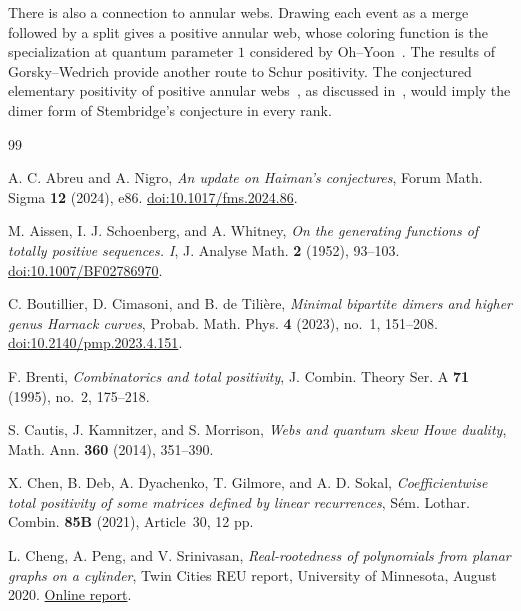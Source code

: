 \documentclass[11pt]{article}
\theoremstyle{definition}
\theoremstyle{remark}
\begin{document}
There is also a connection to annular webs.
Drawing each event as a merge followed by a
split gives a positive annular web, whose
coloring function is the specialization at
quantum parameter $1$ considered by
Oh--Yoon~\cite[Section~3]{OY}.
The results of Gorsky--Wedrich
\cite[Corollary~1.4]{GW} provide another
route to Schur positivity. The conjectured
elementary positivity of positive annular
webs~\cite[Conjecture~5.4]{QR},
as discussed in~\cite[Conjecture~1.1]{OY},
would imply the dimer form of Stembridge's
conjecture in every rank.

\FloatBarrier




\begingroup
\small
\begin{thebibliography}{99}
\setlength{\itemsep}{1pt}
\setlength{\parsep}{0pt}

 A. C. Abreu and A. Nigro, \emph{An update on Haiman's conjectures}, Forum Math. Sigma \textbf{12} (2024), e86. \href{https://doi.org/10.1017/fms.2024.86}{doi:10.1017/fms.2024.86}.

 M. Aissen, I. J. Schoenberg, and A. Whitney, \emph{On the generating functions of totally positive sequences. I}, J. Analyse Math. \textbf{2} (1952), 93--103. \href{https://doi.org/10.1007/BF02786970}{doi:10.1007/BF02786970}.

 C. Boutillier, D. Cimasoni, and B. de Tili\`ere, \emph{Minimal bipartite dimers and higher genus Harnack curves}, Probab. Math. Phys. \textbf{4} (2023), no.~1, 151--208. \href{https://doi.org/10.2140/pmp.2023.4.151}{doi:10.2140/pmp.2023.4.151}.

 F. Brenti, \emph{Combinatorics and total positivity}, J. Combin. Theory Ser. A \textbf{71} (1995), no.~2, 175--218.

 S. Cautis, J. Kamnitzer, and S. Morrison, \emph{Webs and quantum skew Howe duality}, Math. Ann. \textbf{360} (2014), 351--390.

 X. Chen, B. Deb, A. Dyachenko, T. Gilmore, and A. D. Sokal, \emph{Coefficientwise total positivity of some matrices defined by linear recurrences}, S\'em. Lothar. Combin. \textbf{85B} (2021), Article~30, 12 pp.

 L. Cheng, A. Peng, and V. Srinivasan, \emph{Real-rootedness of polynomials from planar graphs on a cylinder}, Twin Cities REU report, University of Minnesota, August 2020. \href{https://www-users.cse.umn.edu/~reiner/REU/REU2020notes/Problem4_REUreport.pdf}{Online report}.


\end{thebibliography}
\end{document}
